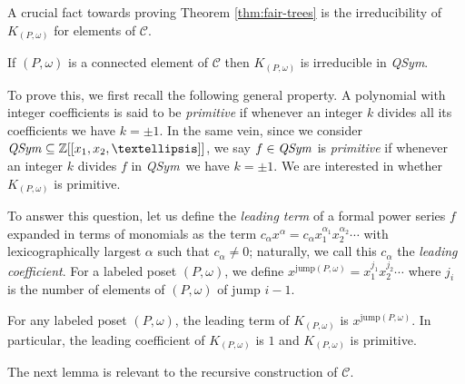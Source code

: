 \documentclass[ALCO,Unicode,published]{cedram}
\newcommand{\qsym}{{\it{QSym}}}
\newcommand{\om}{\omega}
\newcommand{\kpw}{K_{(P,\om)}}
\newcommand{\Cb}{\mathcal{C}}
\begin{document}
A crucial fact towards proving Theorem \ref{thm:fair-trees} is the irreducibility 
of $\kpw$ for elements of $\Cb$. 

\begin{proposition}\label{prop:irred-C}
If $(P,\om)$ is a connected element of $\Cb$ then $\kpw$ is irreducible in \qsym.
\end{proposition}

To prove this, we first recall the following general property.  A polynomial with integer coefficients is said to be \emph{primitive} if 
whenever an integer $k$ divides all its coefficients we have $k=\pm1$.
In the same vein, since we consider $\qsym \subseteq \mathbb{Z}[[x_1, x_2, \ldots]]$, we say $f \in \qsym$ is \emph{primitive} if whenever an integer $k$ divides $f$ in \qsym\ we have $k = \pm1$.
We are interested in whether $\kpw$ is primitive.  

To answer this question, let us define the \emph{leading term} of a formal power series $f$ expanded in terms of monomials as the term $c_\alpha x^\alpha = c_\alpha x_1^{\alpha_1} x_2^{\alpha_2} \cdots$ with lexicographically largest $\alpha$ such that $c_\alpha \neq 0$; naturally, we call this $c_\alpha$ the \emph{leading coefficient}.  For a labeled poset $(P,\om)$, we define $x^{\mathrm{jump}(P,\om)} = x_1^{j_1} x_2^{j_2} \cdots$ where $j_i$ is the number of elements of $(P,\om)$ of jump $i-1$.

\begin{proposition}\label{prop:prim}
For any labeled poset $(P,\om)$, the leading term of $\kpw$ is $x^{\mathrm{jump}(P,\om)}$.  In particular, the leading coefficient of $K_{(P, \om)}$ is $1$ and $K_{(P, \om)}$ is primitive.
\end{proposition}

The next lemma is relevant to the recursive construction of $\Cb$.
\end{document}
